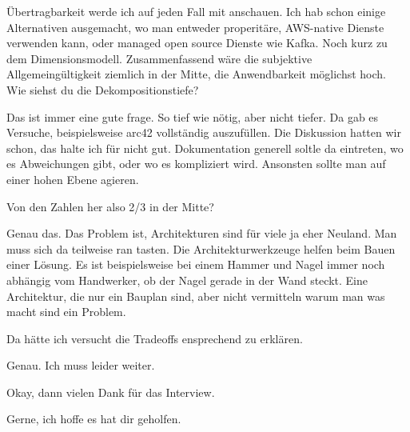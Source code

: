 \LF Übertragbarkeit werde ich auf jeden Fall mit anschauen. Ich hab schon einige Alternativen ausgemacht, wo man entweder properitäre, \ac{AWS}-native Dienste verwenden kann, oder managed open source Dienste wie Kafka. Noch kurz zu dem Dimensionsmodell. Zusammenfassend wäre die subjektive Allgemeingültigkeit ziemlich in der Mitte, die Anwendbarkeit möglichst hoch. Wie siehst du die Dekompositionstiefe?

\RB Das ist immer eine gute frage. So tief wie nötig, aber nicht tiefer. Da gab es Versuche, beispielsweise arc42 vollständig auszufüllen. Die Diskussion hatten wir schon, das halte ich für nicht gut. Dokumentation generell soltle da eintreten, wo es Abweichungen gibt, oder wo es kompliziert wird. Ansonsten sollte man auf einer hohen Ebene agieren.

\LF Von den Zahlen her also 2/3 in der Mitte?

\RB Genau das. Das Problem ist, Architekturen sind für viele ja eher Neuland. Man muss sich da teilweise ran tasten. Die Architekturwerkzeuge helfen beim Bauen einer Lösung. Es ist beispielsweise bei einem Hammer und Nagel immer noch abhängig vom Handwerker, ob der Nagel gerade in der Wand steckt. Eine Architektur, die nur ein Bauplan sind, aber nicht vermitteln warum man was macht sind ein Problem.

\LF Da hätte ich versucht die Tradeoffs ensprechend zu erklären.

\RB Genau. Ich muss leider weiter.

\LF Okay, dann vielen Dank für das Interview.

\RB Gerne, ich hoffe es hat dir geholfen.
